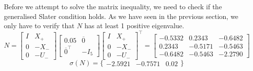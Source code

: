 Before we attempt to solve the matrix inequality, we need to check if the generalised Slater condition holds. As we have seen in the previous section, we only have to verify that $N$ has at least 1 positive eigenvalue.
\begin{equation*}
 N = 
 \begin{bmatrix} I&X_+ \\ 0 & -X_- \\ 0&-U_- \end{bmatrix}
 \begin{bmatrix} 0.05 & \overline{0} \\ \overline{0}^\top & -I_5 \end{bmatrix}
 \begin{bmatrix} I&X_+ \\ 0 & -X_- \\ 0&-U_- \end{bmatrix}^\top 
 =
 \begin{bmatrix} 
 -0.5332 &  0.2343 & -0.6482\\
  0.2343 & -0.5171 & -0.5463 \\
 -0.6482 & -0.5463 & -2.2790
 \end{bmatrix} 
\end{equation*}
\begin{equation*}
 \sigma(N) = \{ \begin{array}{ccc}
 -2.5921 & -0.7571 & 0.02
 \end{array} \}
\end{equation*}

